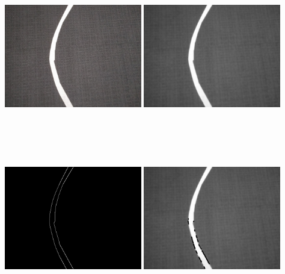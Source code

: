 \documentclass[17pt, a1paper, portrait]{tikzposter}
\begin{document}
\begin{columns}
{\begin{center}
\includegraphics[height = 7cm, width = 6cm]{poster_images/reel3.jpg}
\includegraphics[height = 7cm, width = 6cm]{poster_images/gray.jpg}
\includegraphics[height = 7cm, width = 6cm]{poster_images/canny_edge.jpg}
\includegraphics[height = 7cm, width = 6cm]{poster_images/houghlines_maybe.jpg}
\end{center}

}
\end{columns}
\end{document}
